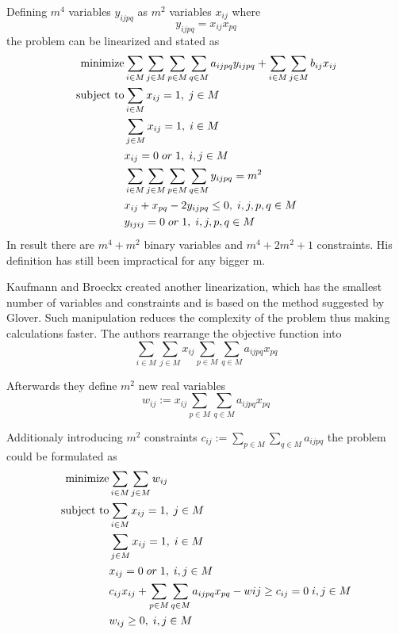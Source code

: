 Defining $m^4$ variables $y_{ijpq}$ as $m^2$ variables $x_{ij}$ where
\begin{equation}
y_{ijpq} = x_{ij}x_{pq}
\end{equation}
the problem can be linearized and stated as
\begin{align}
  \text{minimize} &\null \sum_{i \in M} \sum_{j \in M} \sum_{p \in M} \sum_{q \in M} a_{ijpq}y_{ijpq} + \sum_{i \in M} \sum_{j \in M} b_{ij} x_{ij} \\
  \text{subject to} &\null \sum_{i \in M} x_{ij} = 1, \; j \in M \\
  &\null \sum_{j \in M} x_{ij} = 1, \; i \in M \\
  &\null x_{ij} = 0 \; or \; 1, \; i, j \in M \\
  &\null \sum_{i \in M} \sum_{j \in M} \sum_{p \in M} \sum_{q \in M} y_{ijpq} = m^2 \; \\
  &\null x_{ij} + x_{pq} - 2y_{ijpq} \leq 0, \; i, j, p, q \in M \\
  &\null y_{ijij} = 0 \; or \; 1, \; i, j, p, q \in M \\
\end{align}
In result there are $m^4 + m^2$ binary variables and $m^4 + 2 m^2 + 1$ constraints.
His definition has still been impractical for any bigger m.

Kaufmann and Broeckx \cite{kaufman1978algorithm} created another linearization, which has the smallest number of variables and constraints and is based on the method suggested by Glover.
Such manipulation reduces the complexity of the problem thus making calculations faster.
The authors rearrange the objective function into
\begin{equation}
  \sum_{i \in M} \sum_{j \in M} x_{ij} \sum_{p \in M} \sum_{q \in M} a_{ijpq} x_{pq}
\end{equation}

Afterwards they define $m^2$ new real variables
\begin{equation}
  w_{ij} := x_{ij}\sum_{p \in M} \sum_{q \in M} a_{ijpq} x_{pq}
\end{equation}

Additionaly introducing $m^2$ constraints $ c_{ij} := \sum_{p \in M} \sum_{q \in M} a_{ijpq} $ the problem could be formulated as
\begin{align}
  \text{minimize} &\null \sum_{i \in M} \sum_{j \in M} w_{ij}\\
  \text{subject to} &\null \sum_{i \in M} x_{ij} = 1, \; j \in M \\
  &\null \sum_{j \in M} x_{ij} = 1, \; i \in M \\
  &\null x_{ij} = 0 \; or \; 1, \; i, j \in M \\
  &\null c_{ij}x_{ij} + \sum_{p \in M} \sum_{q \in M} a_{ijpq}x_{pq} - w{ij} \geq c_{ij} = 0 \; i, j \in M \\
  &\null w_{ij} \geq 0, \; i, j \in M \\
\end{align}

